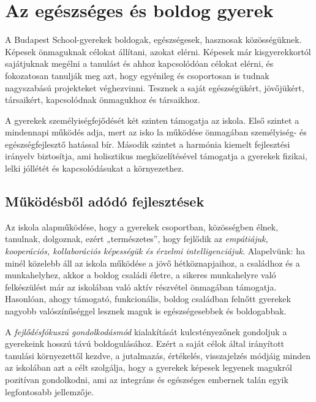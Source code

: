 \hypertarget{az-egeszseges-es-boldog-gyerek}{%
\section{Az egészséges és boldog
gyerek}\label{az-egeszseges-es-boldog-gyerek}}

A Budapest School-gyerekek boldogak, egészségesek, hasznosak
közösségüknek. Képesek önmaguknak célokat állítani, azokat elérni.
Képesek már kisgyerekkortól sajátjuknak megélni a tanulást és ahhoz
kapcsolódóan célokat elérni, és fokozatosan tanulják meg azt, hogy
egyénileg és csoportosan is tudnak nagyszabású projekteket véghezvinni.
Tesznek a saját egészségükért, jövőjükért, társaikért, kapcsolódnak
önmagukhoz és társaikhoz.

A gyerekek személyiségfejődését két szinten támogatja az iskola. Első
szintet a mindennapi működés adja, mert az isko la működése önmagában
személyiség- és egészségfejlesztő hatással bír. Második szintet a
harmónia kiemelt fejlesztési irányelv biztosítja, ami holisztikus
megközelítésével támogatja a gyerekek fizikai, lelki jóllétét és
kapcsolódásukat a környezethez.

\hypertarget{mukodesbol-adodo-fejlesztesek}{%
\subsection{Működésből adódó
fejlesztések}\label{mukodesbol-adodo-fejlesztesek}}

Az iskola alapműködése, hogy a gyerekek csoportban, közösségben élnek,
tanulnak, dolgoznak, ezért „természetes'', hogy fejlődik az
\emph{empátiájuk, kooperációs, kollaborációs képességük és érzelmi
intelligenciájuk}. Alapelvünk: ha minél közelebb áll az iskola működése
a jövő hétköznapjaihoz, a családhoz és a munkahelyhez, akkor a boldog
családi életre, a sikeres munkahelyre való felkészülést már az iskolában
való aktív részvétel önmagában támogatja. Hasonlóan, ahogy támogató,
funkcionális, boldog családban felnőtt gyerekek nagyobb valószínűséggel
lesznek maguk is egészségesebbek és boldogabbak.

A \emph{fejlődésfókuszú gondolkodásmód} kialakítását kulcstényezőnek
gondoljuk a gyerekeink hosszú távú boldogulásához. Ezért a saját célok
által irányított tanulási környezettől kezdve, a jutalmazás, értékelés,
visszajelzés módjáig minden az iskolában azt a célt szolgálja, hogy a
gyerekek képesek legyenek magukról pozitívan gondolkodni, ami az
integráns és egészséges embernek talán egyik legfontosabb jellemzője.

